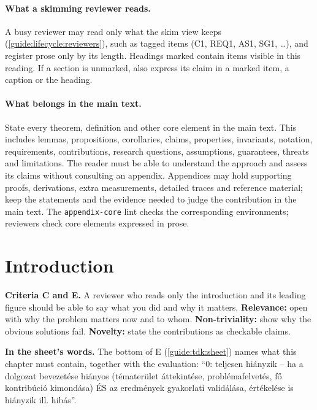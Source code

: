 \paragraph{What a skimming reviewer reads.} A busy reviewer may read only what the skim view keeps (\cref{guide:lifecycle:reviewers}), such as tagged items (C1, REQ1, AS1, SG1, \dots), and register prose only by its length. Headings marked \skimmark{} contain items visible in this reading. If a section is unmarked, also express its claim in a marked item, a caption or the heading.

\paragraph{What belongs in the main text.} State every theorem, definition and other core element in the main text. This includes lemmas, propositions, corollaries, claims, properties, invariants, notation, requirements, contributions, research questions, assumptions, guarantees, threats and limitations. The reader must be able to understand the approach and assess its claims without consulting an appendix. Appendices may hold supporting proofs, derivations, extra measurements, detailed traces and reference material; keep the statements and the evidence needed to judge the contribution in the main text. The \texttt{appendix-core} lint checks the corresponding environments; reviewers check core elements expressed in prose.

\section{Introduction}\label{guide:chapters:intro}
\textbf{Criteria C and E.} A reviewer who reads only the introduction and its leading figure should be able to say what you did and why it matters.
\textbf{Relevance:} open with why the problem matters now and to whom.
\textbf{Non-triviality:} show why the obvious solutions fail.
\textbf{Novelty:} state the contributions as checkable claims.

\textbf{In the sheet's words.} The bottom of E (\cref{guide:tdk:sheet}) names what this chapter must contain, together with the evaluation: \enquote{0: teljesen hiányzik -- ha a dolgozat bevezetése hiányos (tématerület áttekintése, problémafelvetés, fő kontribúció kimondása) ÉS az eredmények gyakorlati validálása, értékelése is hiányzik ill. hibás}.

